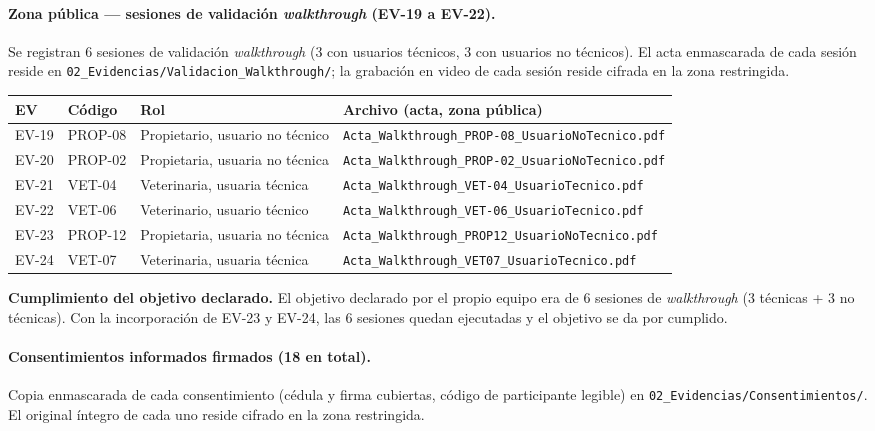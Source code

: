 \documentclass[journal,onecolumn]{IEEEtran}
\begin{document}
	\paragraph{Zona pública --- sesiones de validación \emph{walkthrough} (EV-19 a EV-22).}
	Se registran 6 sesiones de validación \emph{walkthrough} (3 con usuarios
	técnicos, 3 con usuarios no técnicos). El acta enmascarada de cada sesión reside en
	\texttt{02\_Evidencias/Validacion\_Walkthrough/}; la grabación en video de
	cada sesión reside cifrada en la zona restringida.
	
	\begin{table}[H]
		\centering
		\small
		\begin{tabularx}{\textwidth}{@{}l l X X@{}}
			\toprule
			\textbf{EV} & \textbf{Código} & \textbf{Rol} & \textbf{Archivo (acta, zona pública)} \\
			\midrule
			EV-19 & PROP-08 & Propietario, usuario no técnico & \texttt{Acta\_Walkthrough\_PROP-08\_UsuarioNoTecnico.pdf} \\
			EV-20 & PROP-02 & Propietaria, usuaria no técnica & \texttt{Acta\_Walkthrough\_PROP-02\_UsuarioNoTecnico.pdf} \\
			EV-21 & VET-04 & Veterinaria, usuaria técnica & \texttt{Acta\_Walkthrough\_VET-04\_UsuarioTecnico.pdf} \\
			EV-22 & VET-06 & Veterinario, usuario técnico & \texttt{Acta\_Walkthrough\_VET-06\_UsuarioTecnico.pdf} \\
			EV-23 & PROP-12 & Propietaria, usuaria no técnica & \texttt{Acta\_Walkthrough\_PROP12\_UsuarioNoTecnico.pdf} \\
			EV-24 & VET-07 & Veterinaria, usuaria técnica & \texttt{Acta\_Walkthrough\_VET07\_UsuarioTecnico.pdf} \\
			\bottomrule
		\end{tabularx}
	\end{table}
	
	\textbf{Cumplimiento del objetivo declarado.} El objetivo
	declarado por el propio equipo era de
	6 sesiones de \emph{walkthrough} (3 técnicas + 3 no técnicas). Con la
	incorporación de EV-23 y EV-24, las 6 sesiones quedan ejecutadas y el
	objetivo se da por cumplido.
	
	\paragraph{Consentimientos informados firmados (18 en total).}
	Copia enmascarada de cada consentimiento (cédula y firma cubiertas, código
	de participante legible) en \texttt{02\_Evidencias/Consentimientos/}. El
	original íntegro de cada uno reside cifrado en la zona restringida.
	
\end{document}
